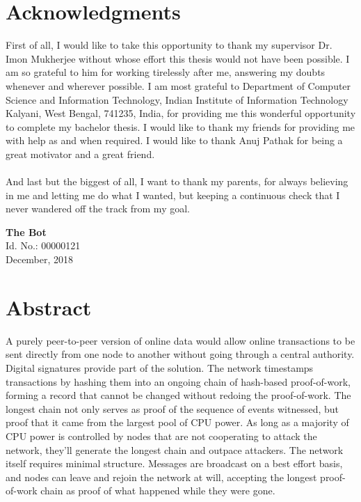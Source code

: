 \documentclass[a4paper,12pt]{report}
\begin{document}
\chapter*{Acknowledgments}
First of all, I would like to take this opportunity to thank my supervisor Dr. Imon Mukherjee without whose effort this thesis would not have been possible. I am so grateful to him for working tirelessly after me, answering my doubts whenever and wherever
possible. I am most grateful to Department of Computer Science and Information Technology,  Indian Institute of Information Technology Kalyani, West Bengal, 741235, India, for providing me this wonderful opportunity to complete my bachelor thesis. I would like to thank my friends for providing me with help as and when required. I would like to thank Anuj Pathak for being a great motivator and a great friend.\\
\\
\linebreak And last but the biggest of all, I want to thank my parents, for always believing in me and letting me do what I wanted, but keeping a continuous check that I never wandered off the track from my goal.\\


\bigskip
\bigskip
\bigskip
\bigskip
\begin{flushleft}
\bigskip
\textbf{The Bot}\\
\smallskip
 Id. No.: 00000121\\
 December, 2018\\
\end{flushleft}


\newpage
\chapter*{Abstract}
A purely peer-to-peer version of online data would allow online transactions to be sent directly from one node to another without going through a central authority. Digital signatures provide part of the solution.
The network timestamps transactions by hashing them into an ongoing chain of hash-based proof-of-work, forming a record that cannot be changed without redoing the proof-of-work. The longest chain not only serves as proof of the sequence of events witnessed, but proof that it came from the largest pool of CPU power. As long as a majority of CPU power is controlled by nodes that are not cooperating to attack the network, they'll generate the longest chain and outpace attackers. The network itself requires minimal structure. Messages are broadcast on a best effort basis, and nodes can leave and rejoin the network at will, accepting the longest proof-of-work chain as proof of what happened while they were gone.
\end{document}
